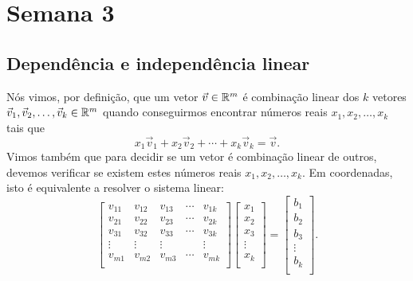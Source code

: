 \documentclass[../livro.tex]{subfiles}
\begin{document}
\chapter{Semana 3}

\section{Dependência e independência linear}

Nós vimos, por definição, que um vetor $\vec{v} \in \mathbb{R}^m$ é combinação linear dos $k$ vetores $\vec{v}_1, \vec{v}_2, \dots, \vec{v}_k  \in \mathbb{R}^m$ quando conseguirmos encontrar números reais $x_1, x_2, \dots, x_k$ tais que
\begin{equation}
x_1 \vec{v}_1 + x_2 \vec{v}_2 + \cdots + x_k \vec{v}_k = \vec{v}.
\end{equation} Vimos também que para decidir se um vetor é combinação linear de outros, devemos verificar se existem estes números reais $x_1, x_2, \dots, x_k$. Em coordenadas, isto é equivalente a resolver o sistema linear:
\begin{equation}
\left[
  \begin{array}{ccccc}
   v_{11} & v_{12} & v_{13} & \cdots & v_{1k}  \\
   v_{21} & v_{22} & v_{23} & \cdots & v_{2k}  \\
   v_{31} & v_{32} & v_{33} & \cdots & v_{3k}  \\
   \vdots & \vdots & \vdots &        & \vdots  \\
   v_{m1} & v_{m2} & v_{m3} & \cdots & v_{mk}  \\
  \end{array}
\right] \left[
  \begin{array}{c}
    x_{1} \\
    x_{2} \\
    x_{3} \\
    \vdots \\
    x_{k} \\
  \end{array}
\right] =
\left[
  \begin{array}{c}
    b_{1} \\
    b_{2} \\
    b_{3} \\
    \vdots \\
    b_{k} \\
  \end{array}
\right].
\end{equation}
\end{document}
